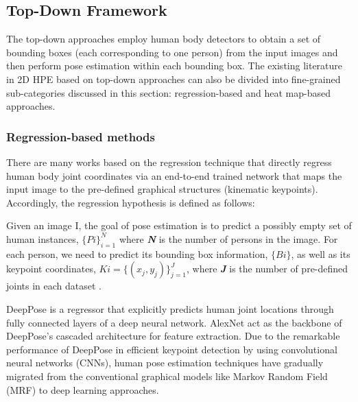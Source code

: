 \subsection{Top-Down Framework}

The top-down approaches employ human body detectors \cite{ren_faster_2016, micilotta_real-time_2006} to obtain a set of bounding boxes (each corresponding to one person) from the input images and then perform pose estimation within each bounding box. The existing literature in 2D HPE based on top-down approaches can also be divided into fine-grained sub-categories discussed in this section: regression-based and heat map-based approaches. 

\subsubsection{Regression-based methods}

There are many works based on the regression technique \cite{carreira_human_2016, fan_combining_2015, fieraru_learning_2018, li_heterogeneous_2014, qiu_peeking_2020, sun_compositional_2017, sun_integral_2018, toshev_deeppose_2014, wang_graph-pcnn_2020,z} that directly regress human body joint coordinates via an end-to-end trained network that maps the input image to the pre-defined graphical structures (kinematic keypoints). Accordingly, the regression hypothesis is defined as follows:

Given an image I, the goal of pose estimation is to predict a possibly empty set of human instances, $\{Pi\}_{i=1}^N$ where \textbf{\textit{N}} is the number of persons in the image. For each person, we need to predict its bounding box information, $\{Bi\}$, as well as its keypoint coordinates, $Ki=\{(x_j, y_j)\}_{j=1}^J$, where \textbf{\textit{J}} is the number of pre-defined joints in each dataset \cite{li_pose_2021}.

DeepPose \cite{toshev_deeppose_2014} is a regressor that explicitly predicts human joint locations through fully connected layers of a deep neural network. AlexNet \cite{krizhevsky_imagenet_2012} act as the backbone of DeepPose's cascaded architecture for feature extraction. Due to the remarkable performance of DeepPose in efficient keypoint detection by using convolutional neural networks (CNNs), human pose estimation techniques have gradually migrated from the conventional graphical models \cite{tompson_joint_2014, feng_ning_toward_2005} like Markov Random Field (MRF) \cite{li_markov_1994} to deep learning approaches. 

